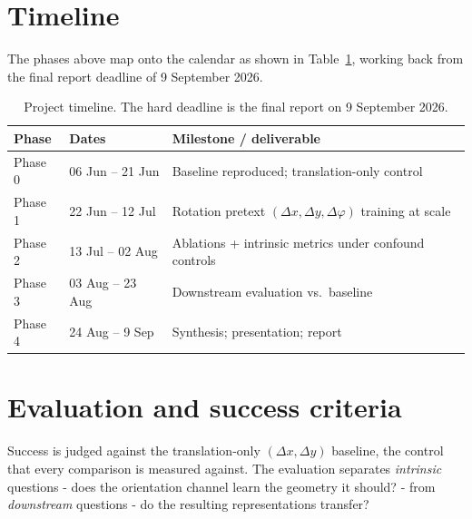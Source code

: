 \documentclass[11pt,a4paper]{report}
\begin{document}
\section{Timeline}
The phases above map onto the calendar as shown in Table~\ref{tab:timeline}, working
back from the final report deadline of 9 September 2026.

\begin{table}[h]
  \centering
  \begin{tabular}{@{}lll@{}}
    \toprule
    Phase & Dates & Milestone / deliverable \\
    \midrule
    Phase 0 & 06 Jun -- 21 Jun & Baseline reproduced; translation-only control \\
    Phase 1 & 22 Jun -- 12 Jul & Rotation pretext $(\Delta x,\Delta y,\Delta\varphi)$ training at scale \\
    Phase 2 & 13 Jul -- 02 Aug & Ablations + intrinsic metrics under confound controls \\
    Phase 3 & 03 Aug -- 23 Aug & Downstream evaluation vs.\ baseline \\
    Phase 4 & 24 Aug -- 9 Sep & Synthesis; presentation; report \\
    \bottomrule
  \end{tabular}
  \caption{Project timeline. The hard deadline is the final report on 9 September 2026.}
  \label{tab:timeline}
\end{table}

\section{Evaluation and success criteria}
Success is judged against the translation-only $(\Delta x, \Delta y)$ baseline, the
control that every comparison is measured against. The evaluation separates
\emph{intrinsic} questions - does the orientation channel learn the geometry it
should? - from \emph{downstream} questions - do the resulting representations
transfer?
\end{document}
